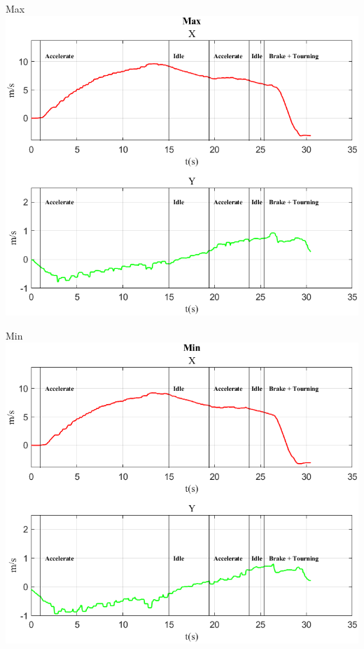 \documentclass[beamer]{standalone}
\begin{document}
	\begin{frame}{{Max}}
		\centering\includegraphics[height=.8\textheight]{figure/Vel/Max}
	\end{frame}
	
	\begin{frame}{{Min}}
		\centering\includegraphics[height=.8\textheight]{figure/Vel/Min}
	\end{frame}
	
\end{document}

